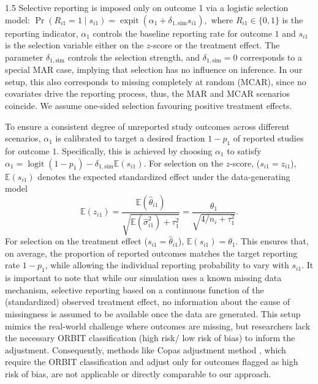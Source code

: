 \documentclass{article}
\begin{document}
\begin{spacing}{1.5}
Selective reporting is imposed only on outcome 1 via a logistic selection model: $\Pr(R_{i1}=1 \mid s_{i1}) = \operatorname{expit}(\alpha_1 + \delta_{1,\text{sim}} s_{i1}),$ where $R_{i1}\in\{0,1\}$ is the reporting indicator, $\alpha_1$ controls the baseline reporting rate for outcome $1$ and $s_{i1}$ is the selection variable either on the $z$-score or the treatment effect. The parameter $\delta_{1,\text{sim}}$ controls the selection strength, and $\delta_{1,\text{sim}}=0$ corresponds to a special MAR case, implying that selection has no influence on inference. In our setup, this also corresponds to missing completely at random (MCAR), since no covariates drive the reporting process, thus, the MAR and MCAR scenarios coincide. We assume one-sided selection favouring positive treatment effects.

To ensure a consistent degree of unreported study outcomes across different scenarios, $\alpha_1$ is calibrated to target a desired fraction $1 - p_1$ of reported studies for outcome $1$. Specifically, this is achieved by choosing $\alpha_1$ to satisfy
$\alpha_1 = \operatorname{logit}\!\left(1 - p_1 \right) - \delta_{1,\text{sim}} \mathbb{E}(s_{i1})$. For selection on the $z$-score, ($s_{i1} = z_{i1}$), $\mathbb{E}(s_{i1})$ denotes the expected standardized effect under the data-generating model
\begin{equation*}
    \mathbb{E}(z_{i1}) = 
    \frac{\mathbb{E}(\hat \theta_{i1})}{\sqrt{\mathbb{E}(\hat\sigma^2_{i1}) + \tau^2_1}} =
    \frac{\theta_{1}}{\sqrt{4/n_i + \tau^2_1}}.
\end{equation*}
For selection on the treatment effect ($s_{i1} = \hat\theta_{i1}$), $\mathbb{E}(s_{i1}) = \theta_1$. This ensures that, on average, the proportion of reported outcomes matches the target reporting rate $1 - p_1$, while allowing the individual reporting probability to vary with $s_{i1}$.
It is important to note that while our simulation uses a known missing data mechanism, \ie selective reporting based on a continuous function of the (standardized) observed treatment effect, no information about the cause of missingness is assumed to be available once the data are generated. This setup mimics the real-world challenge where outcomes are missing, but researchers lack the necessary ORBIT classification (\eg high risk/ low risk of bias) to inform the adjustment. Consequently, methods like Copas adjustment method \cite{copas2019model}, which require the ORBIT classification and adjust only for outcomes flagged as high risk of bias, are not applicable or directly comparable to our approach.


\end{spacing}
\end{document}
